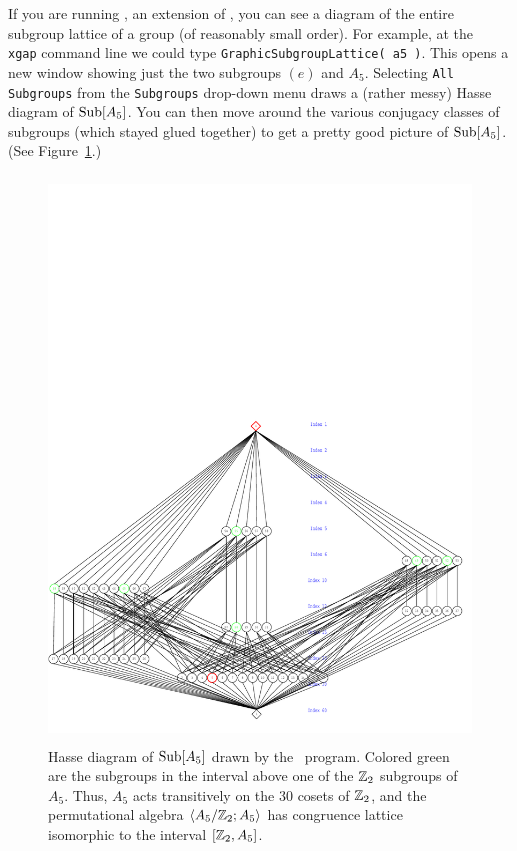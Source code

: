 \noindent If you are running \xgap, an extension of \gap, you can see a diagram of the entire
subgroup lattice of a group (of reasonably small order).  For example, at the {\tt
  xgap} command line we could type {\tt GraphicSubgroupLattice( a5 )}.  This opens a
new window showing just the two subgroups $(e)$ and $A_5$.  Selecting {\tt All
  Subgroups} from the {\tt Subgroups} drop-down menu draws a (rather messy) Hasse
diagram of $\mathrm{Sub}[A_5]$.  You can then move around the various conjugacy classes of
subgroups (which stayed glued together) to get a pretty good picture of
$\mathrm{Sub}[A_5]$. (See Figure~\ref{fig:A5new}.)

\begin{figure}[h!]
\begin{center}
\vspace{-5cm}
\includegraphics[height=15cm]{inputs/A5UpperN5.pdf}%
\caption{Hasse diagram of $\mathrm{Sub}[A_5]$ drawn by the \xgap\ program. Colored green are the
subgroups in the interval above one of the $\mathbb{Z}_2$ subgroups of $A_5$.  Thus,
$A_5$ acts transitively on the 30 cosets of $\mathbb{Z}_2$, and the
permutational algebra $\langle A_5/\mathbb{Z}_2; A_5\rangle$ has congruence lattice isomorphic to 
the interval $[\mathbb{Z}_2, A_5]$.}
\label{fig:A5new}
\end{center}
\end{figure}

